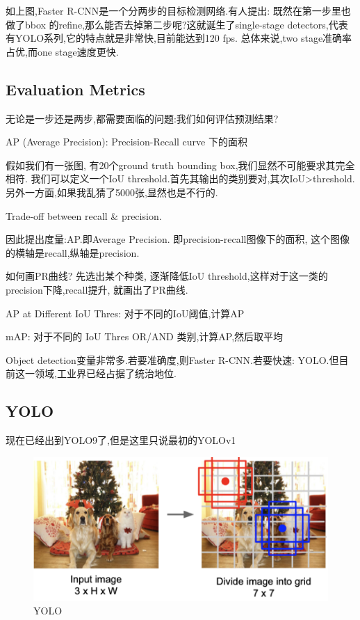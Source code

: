 如上图,Faster R-CNN是一个分两步的目标检测网络.有人提出:
既然在第一步里也做了bbox 的refine,那么能否去掉第二步呢?这就诞生了single-stage 
detectors,代表有YOLO系列,它的特点就是非常快,目前能达到120 fps.
总体来说,two stage准确率占优,而one stage速度更快.

\subsection{Evaluation Metrics}

无论是一步还是两步,都需要面临的问题:我们如何评估预测结果?


AP (Average Precision): Precision-Recall curve 下的面积

假如我们有一张图,
有20个ground truth bounding box,我们显然不可能要求其完全相符.
我们可以定义一个IoU threshold.首先其输出的类别要对,其次IoU>threshold.
另外一方面,如果我乱猜了5000张,显然也是不行的.

Trade-off between
recall \& precision.

因此提出度量:AP.即Average Precision.
即precision-recall图像下的面积, 这个图像的横轴是recall,纵轴是precision.

如何画PR曲线? 先选出某个种类,
逐渐降低IoU threshold,这样对于这一类的precision下降,recall提升, 就画出了PR曲线.

AP at Different IoU Thres: 对于不同的IoU阈值,计算AP

mAP: 对于不同的 IoU Thres OR/AND 类别,计算AP,然后取平均

Object detection变量非常多.若要准确度,则Faster R-CNN.若要快速:
YOLO.但目前这一领域,工业界已经占据了统治地位.

\subsection{YOLO}

现在已经出到YOLO9了,但是这里只说最初的YOLOv1

\begin{figure}[htbp]
    \centering
    \includegraphics[scale=0.3]{figures/YOLO.png}
    \caption{YOLO}
    \label{fig:YOLO}
\end{figure}

